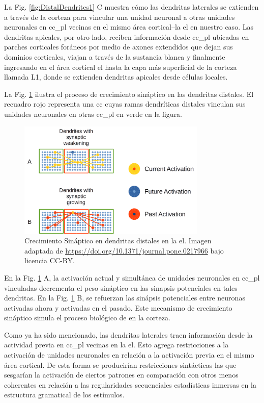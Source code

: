 {La Fig. \ref{fig:DistalDendrites1} C muestra cómo las dendritas laterales se extienden a través de la corteza para vincular una unidad neuronal a otras unidades neuronales en \gls{cc_pl} vecinas en el mismo área cortical--la \gls{el} en nuestro caso.
Las dendritas apicales, por otro lado, reciben información desde \gls{cc_pl} ubicadas en parches corticales foráneos por medio de axones extendidos que dejan sus dominios corticales, viajan a través de la sustancia blanca y finalmente ingresando en el área cortical \gls{el} hasta la capa más superficial de la corteza llamada L1, donde se extienden dendritas apicales desde células locales. 


La Fig. \ref{fig:DistalDendritesGrowth} ilustra el proceso de crecimiento sináptico en las dendritas distales. 
El recuadro rojo representa una \gls{cc} cuyas ramas dendríticas distales vinculan sus unidades neuronales en otras \gls{cc_pl} en verde en la figura.

\begin{figure}[ht!]
    \centering
    \includegraphics[width=0.8\textwidth]{DistalDendritesGrowth.png}
    \caption{Crecimiento Sináptico en dendritas distales en la \gls{el}.
    Imagen adaptada de \url{https://doi.org/10.1371/journal.pone.0217966} bajo licencia CC-BY.}
    \label{fig:DistalDendritesGrowth}
\end{figure}

En la Fig. \ref{fig:DistalDendritesGrowth} A, la activación actual y simultánea de unidades neuronales en \gls{cc_pl} vinculadas decrementa el peso sináptico en las sinapsis potenciales en tales dendritas.
En la Fig. \ref{fig:DistalDendritesGrowth} B, se refuerzan las sinápsis potenciales entre neuronas activadas ahora y activadas en el pasado.
Este mecanismo de crecimiento sináptico simula el proceso biológico de  en la corteza.
 
Como ya ha sido mencionado, las dendritas laterales traen información desde la actividad previa en \gls{cc_pl} vecinas en la \gls{el}.
Esto agrega restricciones a la activación de unidades neuronales en relación a la activación previa en el mismo área cortical.
De esta forma se producirían restricciones sintácticas las que sesgarían la activación de ciertos patrones en comparación con otros menos coherentes en relación a las regularidades secuenciales estadísticas inmersas en la estructura gramatical de los estímulos.

}
